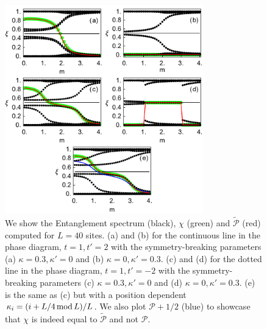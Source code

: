 \documentclass[twocolumn,amsmath,longbibliography,amssymb,superscriptaddress]{revtex4-1}
\begin{document}
\begin{figure}[t]
\centering
\includegraphics[width=86mm]{fig4comp.pdf}
\caption{We show the Entanglement spectrum (black), $\chi$ (green) and $\tilde{\mathcal{P}}$ (red) computed for $L=40$ sites. (a) and (b) for the continuous line in the phase diagram, $t=1,t'=2$  with the symmetry-breaking parameters (a) $\kappa=0.3,\kappa'=0$ and (b) $\kappa=0,\kappa'=0.3$. (c) and (d) for the dotted line in the phase diagram, $t=1,t'=-2$  with the symmetry-breaking parameters (c) $\kappa=0.3,\kappa'=0$ and (d) $\kappa=0,\kappa'=0.3$. (e) is the same as (c) but with a position dependent $\kappa_i=(i+L/4 \, {\rm mod}\, L)/L$. We also plot $\mathcal{P}+1/2$ (blue) to showcase that $\chi$ is indeed equal to $\tilde{\mathcal{P}}$ and not $\mathcal{P}$. }
	\label{2}
\end{figure}
\end{document}
